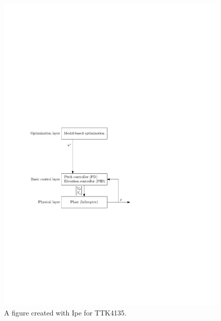 \begin{figure}[tp]
	\centering
	\includegraphics[width=1.00\textwidth]{figures/layers_openloop.pdf}
	\caption{A figure created with Ipe for TTK4135.}
\label{fig:layers_openloop}
\end{figure}

